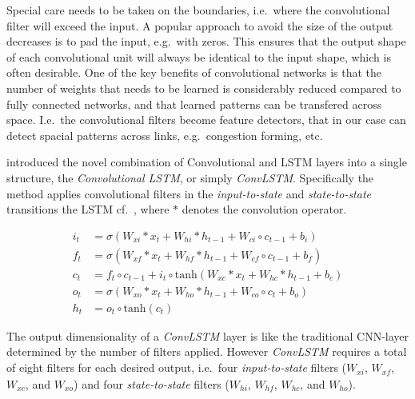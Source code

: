 \documentclass[preprint,11pt,5p,twocolumn]{elsarticle}
\begin{document}
Special care needs to be taken on the boundaries, i.e.\ where the convolutional filter will exceed the input. A popular approach to avoid the size of the output decreases is to pad the input, e.g.\ with zeros. This ensures that the output shape of each convolutional unit will always be identical to the input shape, which is often desirable. One of the key benefits of convolutional networks is that the number of weights that needs to be learned is considerably reduced compared to fully connected networks, and that learned patterns can be transfered across space. I.e.\ the convolutional filters become feature detectors, that in our case can detect spacial patterns across links, e.g.\ congestion forming, etc.   

\citet{ConvLSTM} introduced the novel combination of Convolutional and LSTM layers into a single structure, the \emph{Convolutional LSTM}, or simply \emph{ConvLSTM}. Specifically the method applies convolutional filters in the \emph{input-to-state} and \emph{state-to-state} transitions the LSTM cf.\ , where $*$ denotes the convolution operator.

\begin{equation}
\begin{aligned}
  i_t &= \sigma \left( W_\mathit{xi} * x_t + W_\mathit{hi} * h_{t-1} + W_{ci} \circ c_{t-1} + b_i \right) \\
  f_t &= \sigma \left( W_\mathit{xf} * x_t + W_\mathit{hf} * h_{t-1} + W_\mathit{cf} \circ c_{t-1} + b_f \right) \\
  c_t &= f_t \circ c_{t-1} + i_t \circ \mathrm{tanh} \left( W_\mathit{xc} * x_t + W_\mathit{hc} * h_{t-1} + b_c \right) \\
  o_t &= \sigma \left( W_\mathit{xo} * x_t + W_\mathit{ho} * h_{t-1} + W_\mathit{co} \circ c_{t} + b_o \right) \\
  h_t &= o_t \circ \mathrm{tanh} \left( c_t \right)
\end{aligned}
\label{eq:convlstm}
\end{equation}
\vspace{.5em}

The output dimensionality of a \emph{ConvLSTM} layer is like the traditional CNN-layer determined by the number of filters applied. However \emph{ConvLSTM} requires a total of eight filters for each desired output, i.e.\ four \emph{input-to-state} filters ($W_\mathit{xi}$, $W_\mathit{xf}$, $W_\mathit{xc}$, and $W_\mathit{xo}$) and four \emph{state-to-state} filters ($W_\mathit{hi}$, $W_\mathit{hf}$, $W_\mathit{hc}$, and $W_\mathit{ho}$).
\end{document}
